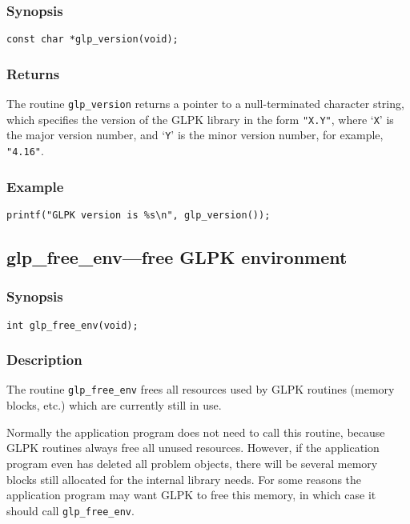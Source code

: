 \subsubsection*{Synopsis}

\begin{verbatim}
const char *glp_version(void);
\end{verbatim}

\subsubsection*{Returns}

The routine \verb|glp_version| returns a pointer to a null-terminated
character string, which specifies the version of the GLPK library in
the form \verb|"X.Y"|, where `\verb|X|' is the major version number, and
`\verb|Y|' is the minor version number, for example, \verb|"4.16"|.

\subsubsection*{Example}

\begin{footnotesize}
\begin{verbatim}
printf("GLPK version is %s\n", glp_version());
\end{verbatim}
\end{footnotesize}

\subsection{glp\_free\_env---free GLPK environment}

\subsubsection*{Synopsis}

\begin{verbatim}
int glp_free_env(void);
\end{verbatim}

\subsubsection*{Description}

The routine \verb|glp_free_env| frees all resources used by GLPK
routines (memory blocks, etc.) which are currently still in use.

Normally the application program does not need to call this routine,
because GLPK routines always free all unused resources. However, if
the application program even has deleted all problem objects, there
will be several memory blocks still allocated for the internal library
needs. For some reasons the application program may want GLPK to free
this memory, in which case it should call \verb|glp_free_env|.

